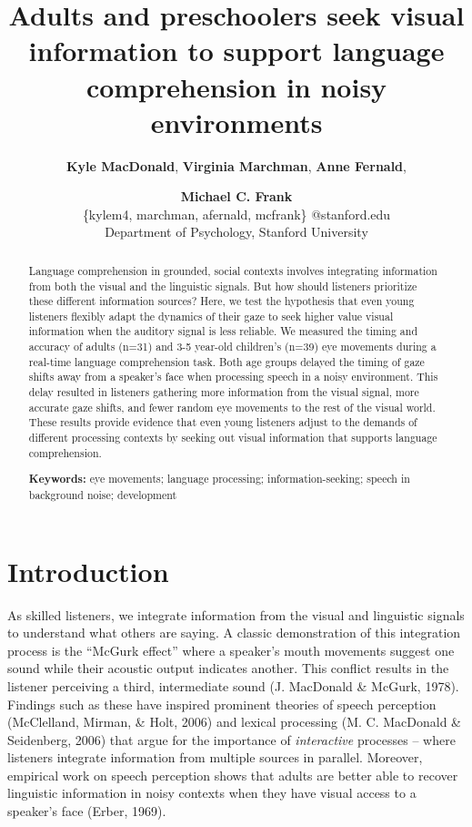 \documentclass[10pt, letterpaper]{article}
\title{Adults and preschoolers seek visual information to support language
comprehension in noisy environments}
\author{{\large \bf Kyle MacDonald}, {\large \bf Virginia Marchman}, {\large \bf Anne Fernald}, \and {\large \bf Michael C. Frank} \\ \{kylem4, marchman, afernald, mcfrank\} @stanford.edu \\ Department of Psychology, Stanford University}
\begin{document}
\maketitle

\begin{abstract}
Language comprehension in grounded, social contexts involves integrating
information from both the visual and the linguistic signals. But how
should listeners prioritize these different information sources? Here,
we test the hypothesis that even young listeners flexibly adapt the
dynamics of their gaze to seek higher value visual information when the
auditory signal is less reliable. We measured the timing and accuracy of
adults (n=31) and 3-5 year-old children's (n=39) eye movements during a
real-time language comprehension task. Both age groups delayed the
timing of gaze shifts away from a speaker's face when processing speech
in a noisy environment. This delay resulted in listeners gathering more
information from the visual signal, more accurate gaze shifts, and fewer
random eye movements to the rest of the visual world. These results
provide evidence that even young listeners adjust to the demands of
different processing contexts by seeking out visual information that
supports language comprehension.

\textbf{Keywords:}
eye movements; language processing; information-seeking; speech in
background noise; development
\end{abstract}

\section{Introduction}\label{introduction}

As skilled listeners, we integrate information from the visual and
linguistic signals to understand what others are saying. A classic
demonstration of this integration process is the ``McGurk effect'' where
a speaker's mouth movements suggest one sound while their acoustic
output indicates another. This conflict results in the listener
perceiving a third, intermediate sound (J. MacDonald \& McGurk, 1978).
Findings such as these have inspired prominent theories of speech
perception (McClelland, Mirman, \& Holt, 2006) and lexical processing
(M. C. MacDonald \& Seidenberg, 2006) that argue for the importance of
\emph{interactive} processes -- where listeners integrate information
from multiple sources in parallel. Moreover, empirical work on speech
perception shows that adults are better able to recover linguistic
information in noisy contexts when they have visual access to a
speaker's face (Erber, 1969).
\end{document}
